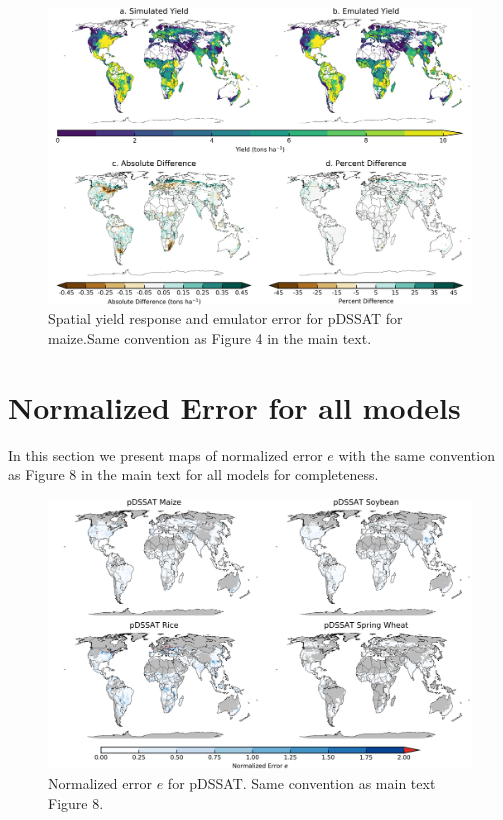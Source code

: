 \documentclass[12pt]{article}
\begin{document}
\begin{figure}[h!]
  \includegraphics[width=\textwidth]{pdssat_maize.png}
  \caption{Spatial yield response and emulator error for pDSSAT for maize.Same convention as Figure 4 in the main text.}
  \label{fig:lpjmlrice}
\end{figure}


\clearpage
\section{Normalized Error for all models}
\begin{flushleft}
In this section we present maps of normalized error $e$ with the same convention as Figure 8 in the main text for all models for completeness. 
\end{flushleft}

\begin{figure}[h!]
  \centering
  \includegraphics[width=15.5cm]{pDSSAT_spatial_error.png}
  \caption{Normalized error $e$ for pDSSAT. Same convention as main text Figure 8.}
\end{figure}
\end{document}
